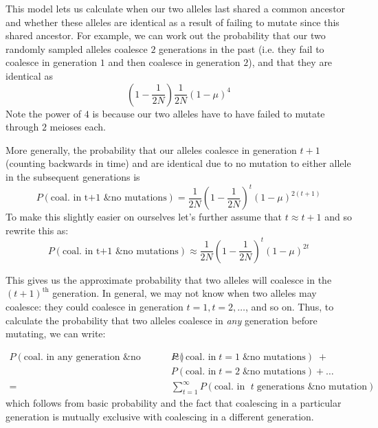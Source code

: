 This model lets us calculate when our two alleles last shared a common
ancestor and whether these alleles are identical as a result of
failing to mutate since this shared ancestor.  For example, we can work out the probability that our
two randomly sampled alleles coalesce $2$ generations in the past
(i.e. they fail to coalesce in generation $1$ and then coalesce in
generation $2$), and
that they are identical as
\begin{equation}
\left(1- \frac{1}{2N} \right) \frac{1}{2N} (1-\mu)^4
\end{equation}
Note the power of $4$ is because our two alleles have to have failed
to mutate through $2$ meioses each. 

More generally, the probability that our alleles coalesce in generation
$t+1$ (counting backwards in time) and are identical due to no mutation to either allele in the
subsequent generations is
%
\begin{equation}
P(\textrm{coal. in t+1 \& no mutations}) =  \frac{1}{2N} \left(1- \frac{1}{2N} \right)^t \left(1-\mu \right)^{2(t+1)}
\end{equation}
%
To make this slightly easier on ourselves let's further assume that $t
\approx t+1$ and so rewrite this as:
\begin{equation}
P(\textrm{coal. in t+1 \& no mutations}) \approx \frac{1}{2N} \left(1- \frac{1}{2N} \right)^t \left(1-\mu \right)^{2t}
\end{equation}
%

This gives us the approximate probability that two alleles will coalesce in the
$(t+1)^\text{th}$ generation. In general, we may not know when two alleles may
coalesce: they could coalesce in generation $t=1, t=2, \ldots $, and so on.
Thus, to calculate the probability that two alleles coalesce in \emph{any}
generation before mutating, we can write:

\begin{align*}
  P(\textrm{coal. in any generation \& no mutations}) \approx & P(\textrm{coal. in} \; t=1 \; \textrm{\& no mutations}) \; + \\ 
&  P(\textrm{coal. in} \; t=2 \; \textrm{\& no mutations}) + \ldots \\
  = & \sum_{t=1}^\infty P(\textrm{coal. in } \; t \; \textrm{generations \& no mutation})
\end{align*}
%
which follows from basic probability and the fact that coalescing in a particular generation is mutually exclusive with coalescing in a different generation.


